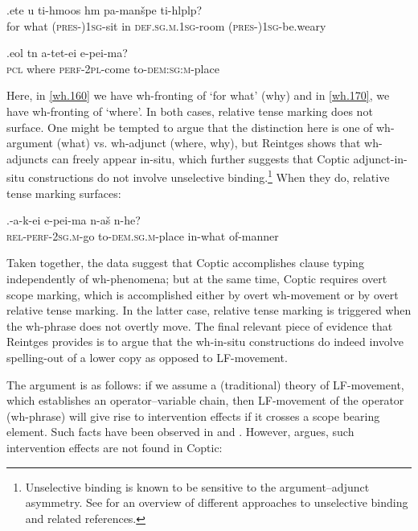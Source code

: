 \documentclass{glossa}
\begin{document}
\exg.\label{wh.160}et{\textbeta}e u ti-hmoos h{\textschwa}m pa-man\v{s}{\textopeno}pe ti-hl{\textschwa}pl{\textopeno}p?\\
   for what (\textsc{pres-})\textsc{1sg}-sit in \textsc{def.sg.m.1sg}-room (\textsc{pres-})\textsc{1sg}-be.weary\\

\exg.\label{wh.170}e{\textbeta}ol t{\textopeno}n a-tet{\textschwa}-ei e-pei-ma?\\
   \textsc{pcl} where \textsc{perf-2pl}-come to-\textsc{dem:sg:m}-place\\

Here, in \ref{wh.160} we have wh-fronting of `for what' (why) and in \ref{wh.170}, we have wh-fronting of `where'. In both cases, relative tense marking does not surface. One might be tempted to argue that the distinction here is one of wh-argument (what) vs. wh-adjunct (where, why), but Reintges shows that wh-adjuncts can freely appear in-situ, which further suggests that Coptic adjunct-in-situ constructions do not involve unselective binding.\footnote{Unselective binding is known to be sensitive to the argument--adjunct asymmetry. See \cite{cheng:2009} for an overview of different approaches to unselective binding and related references.} When they do, relative tense marking surfaces:

\exg.\label{wh.180}{\textschwa}-a-k-ei e-pei-ma {\textschwa}n-a\v{s} {\textschwa}n-he?\\
   \textsc{rel-perf-2sg.m}-go to-\textsc{dem.sg.m}-place in-what of-manner\\

Taken together, the data suggest that Coptic accomplishes clause typing independently of wh-phenomena; but at the same time, Coptic requires overt scope marking, which is accomplished either by overt wh-movement or by overt relative tense marking. In the latter case, relative tense marking is triggered when the wh-phrase does not overtly move. The final relevant piece of evidence that Reintges provides is to argue that the wh-in-situ constructions do indeed involve spelling-out of a lower copy as opposed to LF-movement.

The argument is as follows: if we assume a (traditional) theory of LF-movement, which establishes an operator--variable chain, then LF-movement of the operator (wh-phrase) will give rise to intervention effects if it crosses a scope bearing element. Such facts have been observed in \cite{beck:1996} and \cite{beck-kim:1997}. However, \cite{reintges:2007} argues, such intervention effects are not found in Coptic:
\end{document}

